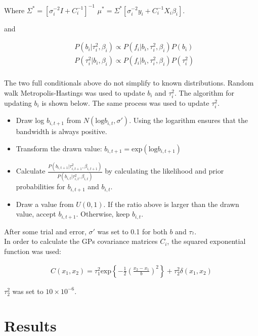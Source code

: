 \documentclass[paper=a4, fontsize=11pt]{scrartcl}
\begin{document}
Where  $\Sigma^*=[\sigma_i^{-2}I + C_i^{-1}]^{-1} $ $\mu^*=\Sigma^*[\sigma_i^{-2}y_i + C_i^{-1}X_i\beta_i]$.


and

\begin{align*}
     & P(b_i |\tau_i^2, \beta_i)  \propto P(f_i|b_i, \tau_i^2, \beta_i)P(b_i) \\
     & P(\tau_i^2 |b_i, \beta_i)  \propto P(f_i|b_i, \tau_i^2, \beta_i)P(\tau_i^2) \\
\end{align*}

The two full conditionals above do not simplify to known distributions. Random walk Metropolis-Hastings was used to update $b_i$ and $\tau_i^2$. The algorithm for updating $b_i$ is shown below. The same process was used to update $\tau_i^2$.
\begin{itemize}
    \item Draw \mbox{log} $b_{i, t+1}$ from $N( \mbox{log}b_{i, t}, \sigma' )$. Using the logarithm ensures that the bandwidth is always positive.
    \item Transform the drawn value: $b_{i, t+1} = \mbox{exp} (\mbox{log} b_{i, t+1})$
    \item Calculate $\frac{P(b_{i, t+1} |\tau_{i, t+1}^2, \beta_{i, t+1})}{P(b_{i, t} |\tau_{i, t}^2, \beta_{i, t})}$ by calculating the likelihood and prior probabilities for $b_{i, t+1}$ and $b_{i, t}$.
    \item Draw a value from $U(0,1)$. If the ratio above is larger than the drawn value, accept $b_{i, t+1}$. Otherwise, keep $b_{i, t}$.
\end{itemize}


After some trial and error, $\sigma'$ was set to 0.1 for both $b$ and $\tau_^2$.\\

In order to calculate the GPs covariance matrices $C_i$, the squared exponential function was used:

\begin{align*}
    C(x_1, x_2) = \tau_1^2 \mbox{exp} \left\{-\frac{1}{2} \left( \frac{x_2 - x_1}{b}\right)^2 \right\} + \tau_2^2  \delta(x_1, x_2)
\end{align*}

$\tau^2_2$ was set to $10 \times 10^{-6}$.

\section{Results}
\end{document}
